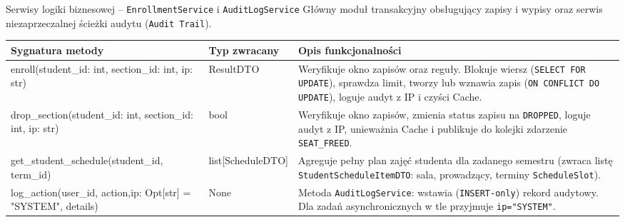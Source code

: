 \documentclass[aspectratio=169, 10pt, xcolor=table]{beamer}
\renewcommand{\arraystretch}{1.18}
\begin{document}
\begin{frame}{Serwisy logiki biznesowej -- \texttt{EnrollmentService} i \texttt{AuditLogService}}
    \scriptsize
    \renewcommand{\arraystretch}{1.15}
    Główny moduł transakcyjny obsługujący zapisy i wypisy oraz serwis niezaprzeczalnej ścieżki audytu (\texttt{Audit Trail}).
    \vspace{3pt}

    \begin{tabularx}{\textwidth}{@{} M{0.36\textwidth} T{0.16\textwidth} Y @{}}
        \toprule
        \textbf{\textsf{\textcolor{NavyPrimary}{Sygnatura metody}}} & \textbf{\textsf{\textcolor{NavyPrimary}{Typ zwracany}}} & \textbf{\textcolor{NavyPrimary}{Opis funkcjonalności}} \\
        \midrule
        enroll(student\_id: int, section\_id: int, ip: str) & ResultDTO & Weryfikuje okno zapisów oraz reguły. Blokuje wiersz (\texttt{SELECT FOR UPDATE}), sprawdza limit, tworzy lub wznawia zapis (\texttt{ON CONFLICT DO UPDATE}), loguje audyt z IP i czyści Cache. \\
        drop\_section(student\_id: int, section\_id: int, ip: str) & bool & Weryfikuje okno zapisów, zmienia status zapisu na \texttt{DROPPED}, loguje audyt z IP, unieważnia Cache i publikuje do kolejki zdarzenie \texttt{SEAT\_FREED}. \\
        get\_student\_schedule(student\_id, term\_id) & list[ScheduleDTO] & Agreguje pełny plan zajęć studenta dla zadanego semestru (zwraca listę \texttt{StudentScheduleItemDTO}: sala, prowadzący, terminy \texttt{ScheduleSlot}). \\
        log\_action(user\_id, action,\newline ip: Opt[str] = "SYSTEM", details) & None & Metoda \texttt{AuditLogService}: wstawia (\texttt{INSERT-only}) rekord audytowy. Dla zadań asynchronicznych w tle przyjmuje \texttt{ip="SYSTEM"}. \\
        \bottomrule
    \end{tabularx}
\end{frame}
\end{document}
